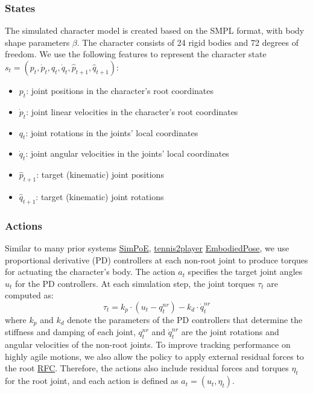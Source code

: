 \documentclass{article}
\begin{document}
\subsubsection{States}\label{states}

The simulated character model is created based on the SMPL format, with body shape parameters $\beta$. The character consists of 24 rigid bodies and 72 degrees of freedom. We use the following features to represent the character state $s_t = (p_t, \dot{p}_t, q_t, \dot{q}_t, \hat{p}_{t+1}, \hat{q}_{t+1})$:

\begin{itemize}
\tightlist
\item
  $p_t$: joint positions in the character's root coordinates
\item
  $\dot{p}_t$: joint linear velocities in the character's root coordinates
\item
  $q_t$: joint rotations in the joints' local coordinates
\item
  $\dot{q}_t$: joint angular velocities in the joints' local coordinates
\item
  $\hat{p}_{t+1}$: target (kinematic) joint positions
\item
  $\hat{q}_{t+1}$: target (kinematic) joint rotations
\end{itemize}

\subsubsection{Actions}\label{actions}

Similar to many prior systems \href{https://arxiv.org/abs/2104.00683}{SimPoE}, \href{https://research.nvidia.com/labs/toronto-ai/vid2player3d/data/tennis_skills_main.pdf}{tennis2player} \href{https://github.com/ZhengyiLuo/EmbodiedPose}{EmbodiedPose}, we use proportional derivative (PD) controllers at each non-root joint to produce torques for actuating the character's body. The action $a_t$ specifies the target joint angles $u_t$ for the PD controllers. At each simulation step, the joint torques $\tau_t$ are computed as: \[\tau_t = k_p \cdot (u_t - q_t^{nr}) - k_d \cdot \dot{q}_t^{nr}\] where $k_p$ and $k_d$ denote the parameters of the PD controllers that determine the stiffness and damping of each joint, $q_t^{nr}$ and $\dot{q}_t^{nr}$ are the joint rotations and angular velocities of the non-root joints. To improve tracking performance on highly agile motions, we also allow the policy to apply external residual forces to the root \href{https://github.com/Khrylx/RFC}{RFC}. Therefore, the actions also include residual forces and torques $\eta_t$ for the root joint, and each action is defined as $a_t = (u_t, \eta_t)$.
\end{document}
